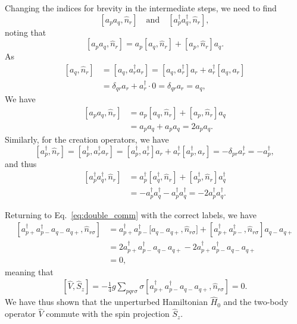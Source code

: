 Changing the indices for brevity in the intermediate steps, we need to find
\begin{equation*}
    \left[ a_{p} a_{q}, \hat{n}_{r} \right] \quad \text{and} \quad \left[ a_{p}^\dagger a_{q}^\dagger, \hat{n}_{r} \right],
\end{equation*}
noting that
\begin{equation*}
    \left[ a_{p} a_{q}, \hat{n}_{r} \right]
    = a_{p} \left[ a_{q}, \hat{n}_{r} \right] + \left[ a_{p}, \hat{n}_{r} \right] a_{q}.
\end{equation*}
As
\begin{align*}
    \left[ a_q, \hat{n}_{r} \right] &= \left[ a_q, a_{r}^\dagger a_{r} \right]
    = \left[ a_q, a_{r}^\dagger \right] a_{r} + a_{r}^\dagger \left[ a_q, a_{r} \right] \\
    &= \delta_{qr} a_{r} + a_{r}^\dagger \cdot 0
    = \delta_{qr} a_{r} = a_{q},
\end{align*}
We have
\begin{align*}
    \left[ a_{p} a_{q}, \hat{n}_{r} \right]
    &= a_{p} \left[ a_{q}, \hat{n}_{r} \right] + \left[ a_{p}, \hat{n}_{r} \right] a_{q} \\
    &= a_{p} a_{q} + a_{p} a_{q} = 2 a_{p} a_{q}.
\end{align*}
Similarly, for the creation operators, we have
\begin{equation*}
    \left[ a_p^\dagger, \hat{n}_r \right] = \left[ a_p^\dagger, a_r^\dagger a_r \right] = \left[ a_p^\dagger, a_r^\dagger \right] a_r + a_r^\dagger \left[ a_p^\dagger, a_r \right] = -\delta_{pr} a_r^\dagger = -a_p^\dagger,
\end{equation*}
and thus
\begin{align*}
    \left[ a_p^\dagger a_q^\dagger, \hat{n}_r \right]
    &= a_p^\dagger \left[ a_q^\dagger, \hat{n}_r \right] + \left[ a_p^\dagger, \hat{n}_r \right] a_q^\dagger \\
    &= - a_p^\dagger a_q^\dagger - a_p^\dagger a_q^\dagger = - 2 a_p^\dagger a_q^\dagger.
\end{align*}

Returning to Eq.~\eqref{eq:double_comm} with the correct labels, we have
\begin{align*}
    \left[ a_{p+}^\dagger a_{p-}^\dagger a_{q-} a_{q+}, \hat{n}_{r\sigma} \right]
    &= a_{p+}^\dagger a_{p-}^\dagger \Big[ a_{q-} a_{q+}, \hat{n}_{r\sigma} \Big] + \left[ a_{p+}^\dagger a_{p-}^\dagger, \hat{n}_{r\sigma} \right] a_{q-} a_{q+} \\
    &= 2 a_{p+}^\dagger a_{p-}^\dagger a_{q-} a_{q+} - 2 a_{p+}^\dagger a_{p-}^\dagger a_{q-} a_{q+} \\
    &= 0,
\end{align*}
meaning that
\begin{align*}
    \left[ \hat{V}, \hat{S}_z \right] = -\frac{1}{4} g \sum_{pqr \sigma} \sigma \left[
        a_{p+}^\dagger a_{p-}^\dagger a_{q-} a_{q+},
        \hat{n}_{r\sigma}
    \right] = 0.
\end{align*}
We have thus shown that the unperturbed Hamiltonian $\hat{H}_0$ and the two-body operator $\hat{V}$ commute with the spin projection $\hat{S}_z$.

